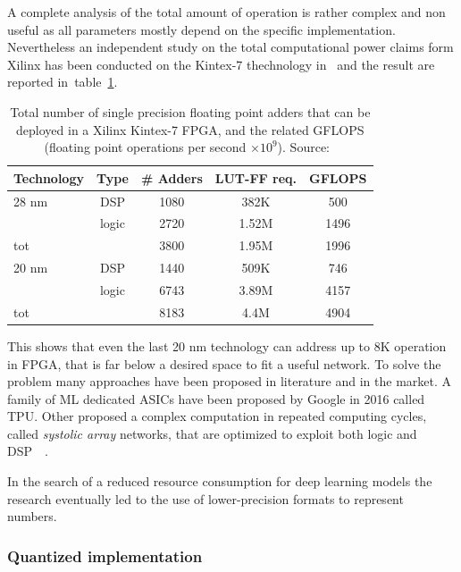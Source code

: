 A complete analysis of the total amount of operation is rather complex and non useful as all parameters mostly depend on the specific implementation. Nevertheless an independent study on the total computational power claims form Xilinx has been conducted on the Kintex-7 thechnology in~\cite{intel_GFLOPS_claims} and the result are reported in~table~\ref{tab:kintex_num_adders}.
\begin{table}[]
    \centering
    \begin{tabular}{l|c|c|c|c}
         \textbf{Technology} & \textbf{Type} & \textbf{\# Adders} & \textbf{LUT-FF req.} & \textbf{GFLOPS} \\
         \hline
         28 nm              & DSP   & 1080 & 382K   & 500  \\
                            & logic & 2720 & 1.52M  & 1496 \\ \hline    
         tot                &       & 3800 & 1.95M  & 1996 \vspace{1cm} \\
         20 nm              & DSP   & 1440 & 509K & 746   \\
                            & logic & 6743 & 3.89M & 4157 \\ \hline    
         tot                &       & 8183 & 4.4M  & 4904 \\
    \end{tabular}
    \caption{Total number of single precision floating point adders that can be deployed in a Xilinx Kintex-7 FPGA, and the related GFLOPS (floating point operations per second $\times 10^9$). Source:~\cite{intel_GFLOPS_claims} }
    \label{tab:kintex_num_adders}
\end{table}
This shows that even the last 20 nm technology can address up to 8K operation in FPGA, that is far below a desired space to fit a useful network.
To solve the problem many approaches have been proposed in literature and in the market. A family of ML dedicated ASICs have been proposed by Google in 2016 called \ac{TPU}. Other proposed a complex computation in repeated computing cycles, called \textit{systolic array} networks, that are optimized to exploit both logic and DSP~\cite{Zhang:2015:OFA:2684746.2689060}~\cite{Wei:2017:ASA:3061639.3062207}.

In the search of a reduced resource consumption for deep learning models the research eventually led to the use of lower-precision formats to represent numbers. 

\subsubsection*{Quantized implementation}

